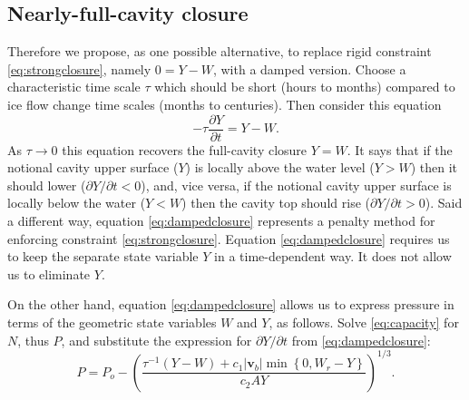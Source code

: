 \documentclass[12pt,final]{amsart}%
\newcommand\bv{\mathbf{v}}
\begin{document}
\subsection*{Nearly-full-cavity closure}  Therefore we propose, as one possible alternative, to replace rigid constraint \eqref{eq:strongclosure}, namely $0 = Y - W$, with a damped version.  Choose a characteristic time scale $\tau$ which should be short (hours to months) compared to ice flow change time scales (months to centuries).  Then consider this equation
\begin{equation}
- \tau \frac{\partial Y}{\partial t} = Y - W. \label{eq:dampedclosure}
\end{equation}
As $\tau \to 0$ this equation recovers the full-cavity closure $Y=W$.  It says that if the notional cavity upper surface ($Y$) is locally above the water level ($Y>W$) then it should lower ($\partial Y/\partial t < 0$), and, vice versa, if the notional cavity upper surface is locally below the water ($Y<W$) then the cavity top should rise ($\partial Y/\partial t > 0$).   Said a different way, equation \eqref{eq:dampedclosure} represents a penalty method for enforcing constraint \eqref{eq:strongclosure}.  Equation \eqref{eq:dampedclosure} requires us to keep the separate state variable $Y$ in a time-dependent way.  It does not allow us to eliminate $Y$.

On the other hand, equation \eqref{eq:dampedclosure} allows us to express pressure in terms of the geometric state variables $W$ and $Y$, as follows.  Solve \eqref{eq:capacity} for $N$, thus $P$, and substitute the expression for $\partial Y/\partial t$ from \eqref{eq:dampedclosure}:
\begin{equation}
P = P_o - \left(\frac{\tau^{-1} (Y-W) + c_1 |\bv_b| \min\left\{0,W_r - Y\right\}}{c_2 A Y}\right)^{1/3}.  \label{eq:pressurenormal}
\end{equation}
\end{document}
